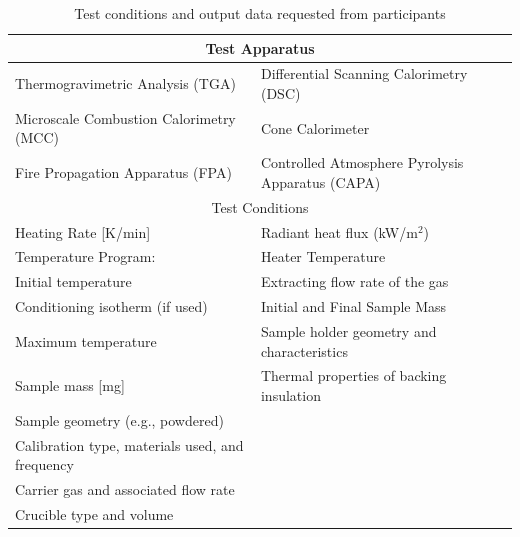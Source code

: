 \documentclass{book}
\begin{document}
\begin{table}[ht]
\caption{Test conditions and output data requested from participants}
\label{Table_2}
\begin{center}
\begin{tabular}{ll}
\multicolumn{2}{c}{Test Apparatus}                                                                       \\ \hline
Thermogravimetric Analysis (TGA)                  & Differential Scanning Calorimetry (DSC)              \\
Microscale Combustion Calorimetry (MCC)           & Cone Calorimeter                                     \\
Fire Propagation Apparatus (FPA)                  & Controlled Atmosphere Pyrolysis Apparatus (CAPA)     \\
\multicolumn{2}{c}{Test Conditions}                                                                      \\ \hline
Heating Rate [K/min]                              & Radiant heat flux (kW/m$^2$)                         \\
Temperature Program:                              & Heater Temperature                                   \\
\hspace{.1in} Initial temperature                 & Extracting flow rate of the gas                      \\
\hspace{.1in} Conditioning isotherm (if used)     & Initial and Final Sample Mass                        \\
\hspace{.1in} Maximum temperature                 & Sample holder geometry and characteristics           \\
Sample mass [mg]                                  & Thermal properties of backing insulation             \\
Sample geometry (e.g., powdered)                  &                                                      \\
Calibration type, materials used, and frequency   &                                                      \\
Carrier gas and associated flow rate              &                                                      \\
Crucible type and volume                          &                                                      \\

\end{tabular}
\end{center}
\end{table}
\end{document}
